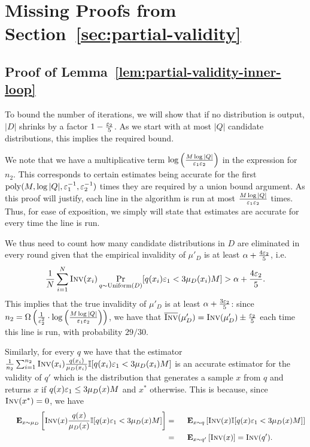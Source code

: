 \section{Missing Proofs from Section~\ref{sec:partial-validity}}
\label{sec:partial-proofs}

\subsection{Proof of Lemma~\ref{lem:partial-validity-inner-loop}}
To bound the number of iterations, we will show that if no distribution is output, $|D|$ shrinks by a factor $1-\frac  {\varepsilon_2}  {5}$. 
As we start with at most $|Q|$ candidate distributions, this  implies the required bound.

We note that we have a multiplicative term $\log \left(\frac{M \log |Q|}{\varepsilon_1 \varepsilon_2}\right)$ in the expression for $n_2$.
This corresponds to certain estimates being accurate for the first $\operatorname*{poly}(M, \log |Q|, \varepsilon_1^{-1}, \varepsilon_2^{-1})$ times they are required by a union bound argument.
As this proof will justify, each line in the algorithm is run at most $\frac{M \log |Q|}{\varepsilon_1\varepsilon_2}$ times.
Thus, for ease of exposition, we simply will state that estimates are accurate for every time the line is run.

We thus need to count how many candidate distributions in $D$ are eliminated in every round given that the empirical invalidity of $\mu'_D$ is at least $\alpha + \frac {4 \varepsilon_2}{5}$, i.e.
$$\frac 1 N \sum_{i=1}^N \textsc{Inv}(x_i) \Pr_{q \sim \text{Uniform}(D)}[q(x_i) {\varepsilon_1} < 3 \mu_D(x_i)  {M} ] > \alpha + \frac {4 \varepsilon_2}{5}.$$
This implies that the true invalidity of $\mu'_D$ is at least $\alpha + \frac {3 \varepsilon_2}{5}$:
since $n_2 = \Omega\left(\frac{1}{\varepsilon_2^2} \cdot \log\left(\frac{M \log |Q|}{\varepsilon_1\varepsilon_2}\right)\right)$, we have that $\overline {\textsc{Inv}}(\mu'_D) = \textsc{Inv}(\mu'_D) \pm \frac {\varepsilon_2}{5}$ each time this line is run, with probability $29/30$.

Similarly, for every $q$ we have that the estimator $\frac{1}{n_2}  \sum_{i=1}^{n_2} \textsc{Inv}(x_i) \frac {q(x_i)} {\mu_D(x_i)} \mathbb{I}[q(x_i) {\varepsilon_1} < 3 \mu_D(x_i) {M} ]$ is an accurate estimator for the validity of $q'$ which is the distribution that generates a sample $x$ from $q$ and returns $x$ if $q(x)  {\varepsilon_1} \le 3 \mu_D(x)  {M}$ and $x^*$ otherwise. This is because, since $\textsc{Inv}(x^*)=0$, we have
$$\begin{aligned}
\Exp_{x \sim \mu_D} \left[ \Inv(x) \frac {q(x)} {\mu_D(x)} \Ind[q(x) {\eps_1} < 3 \mu_D(x) {M} ] \right] &= \Exp_{x \sim q} \left[ \Inv(x) \Ind[q(x) {\eps_1} < 3 \mu_D(x) {M} ] \right]\\
&= \Exp_{x \sim q'} \left[ \Inv(x) \right] = \Inv(q').
\end{aligned}$$


